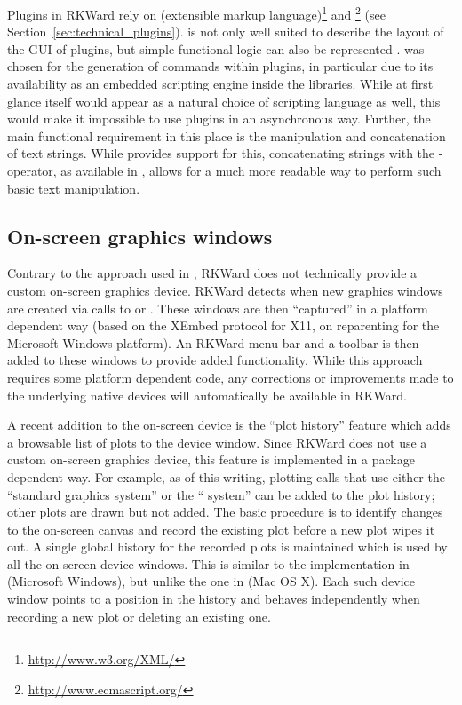 Plugins in RKWard rely on  (extensible markup language)\footnote{\url{http://www.w3.org/XML/}}
and \footnote{\url{http://www.ecmascript.org/}} (see Section~\ref{sec:technical_plugins}).  is not
only well suited to describe the layout of the GUI of plugins, but simple
functional logic can also be represented \citep[see also][]{Visne2009}.  was
chosen for the generation of  commands within plugins, in particular due to its
availability as an embedded scripting engine inside the  libraries. While at
first glance  itself would appear as a natural choice of scripting language as
well, this would make it impossible to use plugins in an asynchronous way.
Further, the main functional requirement in this place is the manipulation and
concatenation of text strings. While  provides support for this, concatenating
strings with the \code{+}-operator, as available in , allows for a much
more readable way to perform such basic text manipulation.

\subsection{On-screen graphics windows}
\label{sec:technical_graphics}
Contrary to the approach used in  \citep{JGR2010}, RKWard does
not technically provide a custom on-screen graphics device. RKWard detects when
new graphics windows are created via calls to  or . These windows
are then ``captured'' in a platform dependent way (based on the XEmbed \citep{Ettrich2002} protocol
for X11, on reparenting for the Microsoft Windows platform). An RKWard menu bar and a
toolbar is then added to these windows to provide added functionality. While
this approach requires some platform dependent code, any corrections or
improvements made to the underlying  native devices will automatically be
available in RKWard.

A recent addition to the on-screen device is the ``plot history'' feature which
adds a browsable list of plots to the device window. Since RKWard does not use a
custom on-screen graphics device, this feature is implemented in a package
dependent way. For example, as of this writing, plotting calls that use either
the ``standard graphics system'' or the `` system'' can be added to the plot
history; other plots are drawn but not added. The basic procedure is to identify
changes to the on-screen canvas and record the existing plot before a new plot
wipes it out. A single global history for the recorded plots is maintained
which is used by all the on-screen device windows. This is similar to the
implementation in  (Microsoft Windows), but unlike the one in  
(Mac OS X). Each such device window points to a position in the history
and behaves independently when recording a new plot or deleting an existing
one.

